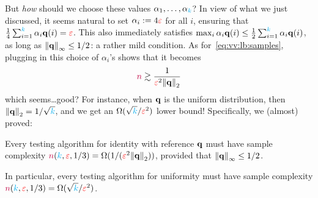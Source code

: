 But \emph{how} should we choose these values $\alpha_1,\dots,\alpha_{\textcolor{cyan}{k}}$? In view of what we just discussed, it seems natural to set $\alpha_i := 4\textcolor{red}{\varepsilon}$ for all $i$, ensuring that $\frac{1}{4}\sum_{i=1}^{\textcolor{cyan}{k}} \alpha_i\mathbf{q}(i) = \textcolor{red}{\varepsilon}$. This also immediately satisfies $\max_{i} \alpha_i\mathbf{q}(i) \leq \frac{1}{2}\sum_{i=1}^{\textcolor{cyan}{k}} \alpha_i\mathbf{q}(i)$, as long as $\norminf{\q}\leq 1/2$: a rather mild condition. As for~\cref{eq:vv:lb:samples}, plugging in this choice of $\alpha_i$'s shows that it becomes
\[
		\ns \gtrsim \frac{1}{\dst^2\normtwo{\q}}
\]
which seems\dots good? For instance, when $\mathbf{q}$ is the uniform distribution, then $\normtwo{\q}=1/\sqrt{\ab}$, and we get an $\Omega(\sqrt{{\textcolor{cyan}{k}}}/\textcolor{red}{\varepsilon}^2)$ lower bound! Specifically, we (almost) proved:
\begin{theorem}
  \label{theo:uniformity:lb:vv}
Every testing algorithm for identity with reference $\mathbf{q}$ must have sample complexity $\ns(\ab,\dst,1/3) = \Omega(1/(\dst^2\normtwo{\q}))$, provided that $\norminf{\q}\leq 1/2$.

In particular, every testing algorithm for uniformity must have sample complexity ${\textcolor{purple}{n}}({\textcolor{cyan}{k}},\textcolor{red}{\varepsilon},1/3) = \Omega(\sqrt{{\textcolor{cyan}{k}}}/\textcolor{red}{\varepsilon}^2)$.
\end{theorem}
